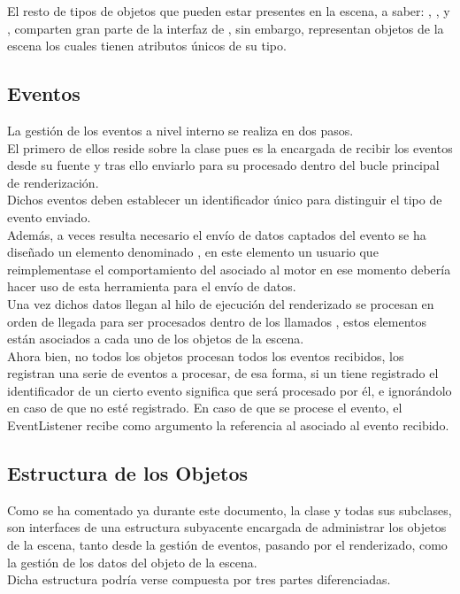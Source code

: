 El resto de tipos de objetos que pueden estar presentes en la escena, a saber: \rorefmodel, \rorefcamera, \roreflight y \rorefscene, comparten gran parte de la interfaz de \rorefobject, sin embargo, representan objetos de la escena los cuales tienen atributos únicos de su tipo.\\ 

\subsection{Eventos}

La gestión de los eventos a nivel interno se realiza en dos pasos.\\
El primero de ellos reside sobre la clase \rorefeventdispatcher pues es la encargada de recibir los eventos desde su fuente y tras ello enviarlo para su procesado dentro del bucle principal de renderización.\\
Dichos eventos deben establecer un identificador único para distinguir el tipo de evento enviado.\\
Además, a veces resulta necesario el envío de datos captados del evento se ha diseñado un elemento denominado \rorefbundle, en este elemento un usuario que reimplementase el comportamiento del \rorefeventdispatcher asociado al motor en ese momento debería hacer uso de esta herramienta para el envío de datos.\\

Una vez dichos datos llegan al hilo de ejecución del renderizado se procesan en orden de llegada para ser procesados dentro de los llamados \rorefeventlistener, estos elementos están asociados a cada uno de los objetos de la escena.\\
Ahora bien, no todos los objetos procesan todos los eventos recibidos, los \rorefeventlistener registran una serie de eventos a procesar, de esa forma, si un \rorefeventlistener tiene registrado el identificador de un cierto evento significa que será procesado por él, e ignorándolo en caso de que no esté registrado. En caso de que se procese el evento, el EventListener recibe como argumento la referencia al \rorefbundle asociado al evento recibido.

\subsection{Estructura de los Objetos}
Como se ha comentado ya durante este documento, la clase \rorefobject y todas sus subclases, son interfaces de una estructura subyacente encargada de administrar los objetos de la escena, tanto desde la gestión de eventos, pasando por el renderizado, como la gestión de los datos del objeto de la escena.\\
Dicha estructura podría verse compuesta por tres partes diferenciadas.

